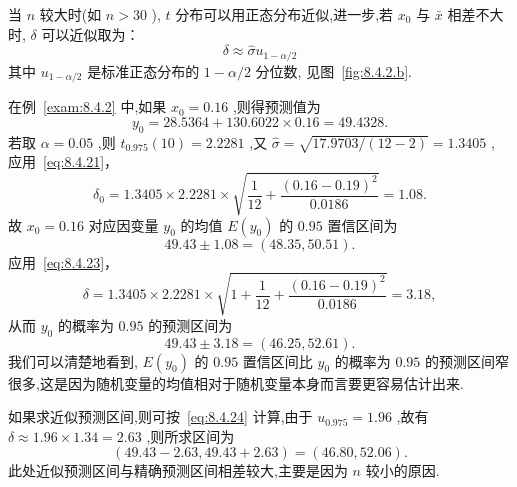 当 $n$ 较大时(如 $n>30$ ), $t$ 分布可以用正态分布近似,进一步,若 $x_0$ 与 $\bar{x}$ 相差不大时, $\delta$ 可以近似取为：
\begin{equation}\label{eq:8.4.24}
\delta \approx \hat{\sigma} u_{1-\alpha/2}
\end{equation}
其中 $u_{1-\alpha/2}$ 是标准正态分布的 $1-\alpha/2$ 分位数, 见图~\ref{fig:8.4.2.b}.

\begin{example}
    在例~\ref{exam:8.4.2} 中,如果 $x_0=0.16$ ,则得预测值为
    \begin{equation*}\label{eq:8.4.25}
    y_0=28.5364+130.6022 \times 0.16=49.4328.
    \end{equation*}
    若取 $\alpha=0.05$ ,则 $t_{0.975}(10)=2.2281$ ,又 $\hat{\sigma}=\sqrt{17.9703/(12-2)}=1.3405$ , 应用~\eqref{eq:8.4.21}，
    \begin{equation*}
    \delta_{0}=1.3405 \times 2.2281 \times \sqrt{\frac{1}{12}+\frac{(0.16-0.19)^{2}}{0.0186}}=1.08.
    \end{equation*}
    故 $x_0=0.16$ 对应因变量 $y_0$ 的均值 $E(y_0)$ 的 $0.95$ 置信区间为
    \begin{equation*}
    49.43\pm 1.08=\left( 48.35,50.51 \right).
    \end{equation*}
    应用~\eqref{eq:8.4.23}，
    \begin{equation*}
    \delta=1.3405 \times 2.2281 \times \sqrt{1+\frac{1}{12}+\frac{(0.16-0.19)^{2}}{0.0186}}=3.18,
    \end{equation*}
    从而 $y_0$ 的概率为 $0.95$ 的预测区间为
    \begin{equation*}
    49.43\pm 3.18=(46.25,52.61).
    \end{equation*}
    我们可以清楚地看到, $E(y_0)$ 的 $0.95$ 置信区间比 $y_0$ 的概率为 $0.95$ 的预测区间窄很多,这是因为随机变量的均值相对于随机变量本身而言要更容易估计出来.

    如果求近似预测区间,则可按~\eqref{eq:8.4.24} 计算,由于 $u_{0.975}=1.96$ ,故有 $\delta\approx 1.96\times 1.34=2.63$ ,则所求区间为
    \begin{equation*}
    (49.43-2.63,49.43+2.63)=(46.80,52.06).
    \end{equation*}
    此处近似预测区间与精确预测区间相差较大,主要是因为 $n$ 较小的原因.
\end{example}

